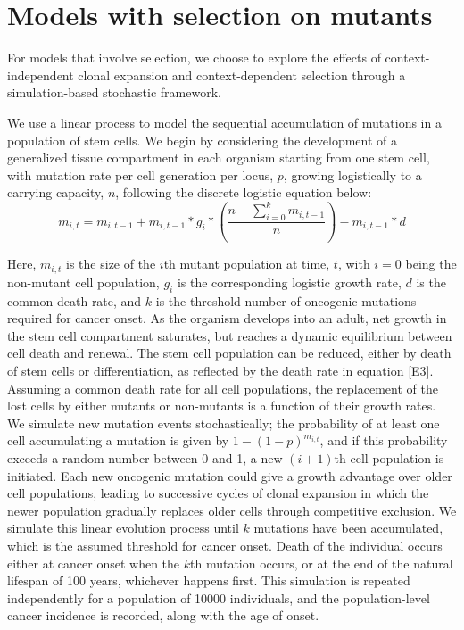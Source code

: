 \documentclass[10pt,twocolumn,twoside]{article}
\begin{document}
\section{Models with selection on mutants}
For models that involve selection, we choose to explore the effects of context-independent clonal expansion and context-dependent selection through a simulation-based stochastic framework. 

We use a linear process to model the sequential accumulation of mutations in a population of stem cells. We begin by considering the development of a generalized tissue compartment in each organism starting from one stem cell, with mutation rate per cell generation per locus, $p$, growing logistically to a carrying capacity, $n$, following the discrete logistic equation below:
\begin{equation}
	m_{i, t} = m_{i, t-1} + m_{i, t-1}*g_{i}*(\dfrac{n-\sum_{i=0}^{k} m_{i, t-1}}{n}) - m_{i, t-1}*d
	\label{E3}	
\end{equation}

Here, $m_{i, t}$ is the size of the $i$th mutant population at time, $t$, with $i=0$ being the non-mutant cell population, $g_{i}$ is the corresponding logistic growth rate, $d$ is the common death rate, and $k$ is the threshold number of oncogenic mutations required for cancer onset. As the organism develops into an adult, net growth in the stem cell compartment saturates, but reaches a dynamic equilibrium between cell death and renewal. The stem cell population can be reduced, either by death of stem cells or differentiation, as reflected by the death rate in equation \ref{E3}. Assuming a common death rate for all cell populations, the replacement of the lost cells by either mutants or non-mutants is a function of their growth rates. We simulate new mutation events stochastically; the probability of at least one cell accumulating a mutation is given by $1-(1-p)^{m_{i, t}}$, and if this probability exceeds a random number between 0 and 1, a new $(i+1)$th cell population is initiated. Each new oncogenic mutation could give a growth advantage over older cell populations, leading to successive cycles of clonal expansion in which the newer population gradually replaces older cells through competitive exclusion. We simulate this linear evolution process until $k$ mutations have been accumulated, which is the assumed threshold for cancer onset. Death of the individual occurs either at cancer onset when the $k$th mutation occurs, or at the end of the natural lifespan of 100 years, whichever happens first. This simulation is repeated independently for a population of 10000 individuals, and the population-level cancer incidence is recorded, along with the age of onset.
\end{document}
